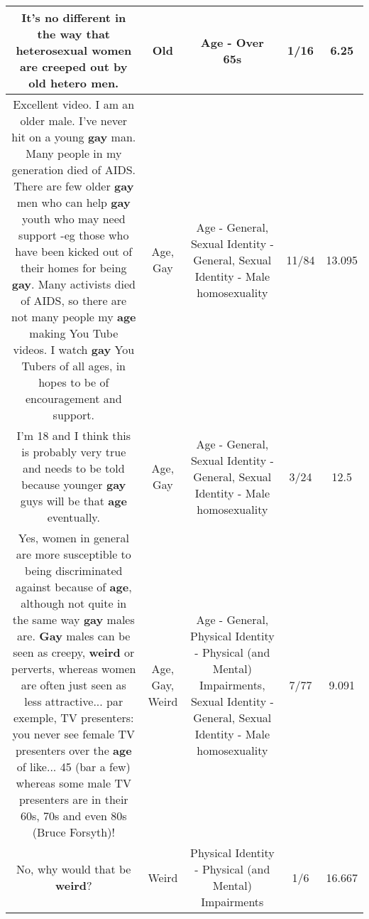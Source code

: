 \documentclass[11pt]{article}
\newlength\mylength
\begin{document}
\begin{center}
\begin{longtable}{|C{.65\mylength}|C{.30\mylength}|C{.12\mylength}|C{.12\mylength}|C{.12\mylength}|}
  \small It's no different in the way that heterosexual women are creeped out by \textbf{old} hetero men.\normalsize   & Old & Age - Over 65s & 1/16 & 6.25 \\  \hline
  \small Excellent video. I am an older male. I've never hit on a young \textbf{g\textbf{ay}} man. Many people in my generation died of AIDS. There are few older \textbf{g\textbf{ay}} men who can help \textbf{g\textbf{ay}} youth who may need support -eg those who have been kicked out of their homes for being \textbf{g\textbf{ay}}. Many activists died of AIDS, so there are not many people my \textbf{age} making You Tube videos. I watch \textbf{g\textbf{ay}} You Tubers of all ages, in hopes to be of encouragement and support.\normalsize   & Age, Gay & Age - General, Sexual Identity - General, Sexual Identity - Male homosexuality & 11/84 & 13.095 \\  \hline
  \small I'm 18 and I think this is probably very true and needs to be told because younger \textbf{g\textbf{ay}} guys will be that \textbf{age} eventually.\normalsize   & Age, Gay & Age - General, Sexual Identity - General, Sexual Identity - Male homosexuality & 3/24 & 12.5 \\  \hline
  \small Yes, women in general are more susceptible to being discriminated against because of \textbf{age}, although not quite in the same way \textbf{g\textbf{ay}} males are. \textbf{G\textbf{ay}} males can be seen as creepy, \textbf{weird} or perverts, whereas women are often just seen as less attractive... par exemple, TV presenters: you never see female TV presenters over the \textbf{age} of like... 45 (bar a few) whereas some male TV presenters are in their 60s, 70s and even 80s (Bruce Forsyth)!\normalsize   & Age, Gay, Weird & Age - General, Physical Identity - Physical (and Mental) Impairments, Sexual Identity - General, Sexual Identity - Male homosexuality & 7/77 & 9.091 \\  \hline
  \small No, why would that be \textbf{weird}?\normalsize   & Weird & Physical Identity - Physical (and Mental) Impairments & 1/6 & 16.667 \\  \hline

\end{longtable}
\end{center}
\end{document}
